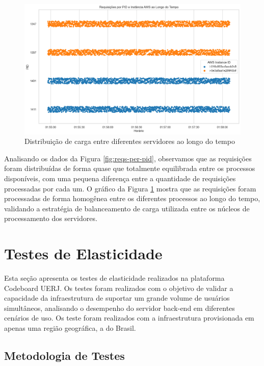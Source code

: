 \begin{figure}[H]
    \centering
    \includegraphics[width=1\textwidth]{assets/balance-test/reqs-per-pid-over-time.png}
    \caption{Distribuição de carga entre diferentes servidores ao longo do tempo}
    \label{fig:reqs-per-pid-over-time}
\end{figure}

Analisando os dados da Figura \ref{fig:reqs-per-pid}, observamos que as requisições foram distribuídas de forma quase que totalmente equilibrada entre os processos disponíveis, com uma pequena diferença entre a quantidade de requisições processadas por cada um. O gráfico da Figura \ref{fig:reqs-per-pid-over-time} mostra que as requisições foram processadas de forma homogênea entre os diferentes processos ao longo do tempo, validando a estratégia de balanceamento de carga utilizada entre os núcleos de processamento dos servidores.


\section{Testes de Elasticidade}

Esta seção apresenta os testes de elasticidade realizados na plataforma Codeboard UERJ. Os testes foram realizados com o objetivo de validar a capacidade da infraestrutura de suportar um grande volume de usuários simultâneos, analisando o desempenho do servidor back-end em diferentes cenários de uso. Os teste foram realizados com a infraestrutura provisionada em apenas uma região geográfica, a do Brasil.


\subsection{Metodologia de Testes}

